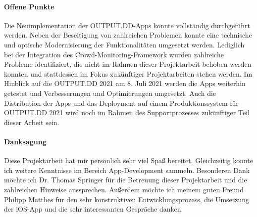 \newpage

\paragraph{Offene Punkte} Die Neuimplementation der OUTPUT.DD-Apps konnte vollständig durchgeführt werden. Neben der Beseitigung von zahlreichen Problemen konnte eine technische und optische Modernisierung der Funktionalitäten umgesetzt werden. Lediglich bei der Integration des Crowd-Monitoring-Framework wurden zahlreiche Probleme identifiziert, die nicht im Rahmen dieser Projektarbeit behoben werden konnten und stattdessen im Fokus zukünftiger Projektarbeiten stehen werden. Im Hinblick auf die OUTPUT.DD 2021 am 8. Juli 2021 werden die Apps weiterhin getestet und Verbesserungen und Optimierungen umgesetzt. Auch die Distribution der Apps und das Deployment auf einem Produktionssystem für OUTPUT.DD 2021 wird noch im Rahmen des Supportprozesses zukünftiger Teil dieser Arbeit sein.

\paragraph{Danksagung}
Diese Projektarbeit hat mir persönlich sehr viel Spaß bereitet. Gleichzeitig konnte ich weitere Kenntnisse im Bereich App-Development sammeln. Besonderen Dank möchte ich Dr. Thomas Springer für die Betreuung dieser Projektarbeit und die zahlreichen Hinweise aussprechen. Außerdem möchte ich meinem guten Freund Philipp Matthes für den sehr konstruktiven Entwicklungsprozess, die Umsetzung der iOS-App und die sehr interessanten Gespräche danken.
